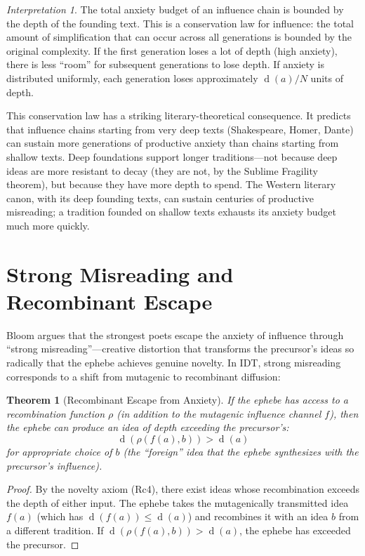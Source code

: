 \documentclass[11pt,openany]{book}
\theoremstyle{definition}
\theoremstyle{plain}
\newtheorem{theorem}[axiom]{Theorem}
\theoremstyle{remark}
\newtheorem{interpretation}[axiom]{Interpretation}
\newcommand{\depth}{\operatorname{d}}       %
\begin{document}
\begin{interpretation}
The total anxiety budget of an influence chain is bounded by the depth of the founding text. This is a conservation law for influence: the total amount of simplification that can occur across all generations is bounded by the original complexity. If the first generation loses a lot of depth (high anxiety), there is less ``room'' for subsequent generations to lose depth. If anxiety is distributed uniformly, each generation loses approximately $\depth(a) / N$ units of depth. 

This conservation law has a striking literary-theoretical consequence. It predicts that influence chains starting from very deep texts (Shakespeare, Homer, Dante) can sustain more generations of productive anxiety than chains starting from shallow texts. Deep foundations support longer traditions---not because deep ideas are more resistant to decay (they are not, by the Sublime Fragility theorem), but because they have more depth to spend. The Western literary canon, with its deep founding texts, can sustain centuries of productive misreading; a tradition founded on shallow texts exhausts its anxiety budget much more quickly.
\end{interpretation}

\section{Strong Misreading and Recombinant Escape}

Bloom argues that the strongest poets escape the anxiety of influence through ``strong misreading''---creative distortion that transforms the precursor's ideas so radically that the ephebe achieves genuine novelty. In IDT, strong misreading corresponds to a shift from mutagenic to recombinant diffusion:

\begin{theorem}[Recombinant Escape from Anxiety]
If the ephebe has access to a recombination function $\rho$ (in addition to the mutagenic influence channel $f$), then the ephebe can produce an idea of depth exceeding the precursor's:
\[
\depth(\rho(f(a), b)) > \depth(a)
\]
for appropriate choice of $b$ (the ``foreign'' idea that the ephebe synthesizes with the precursor's influence).
\end{theorem}

\begin{proof}
By the novelty axiom (Rc4), there exist ideas whose recombination exceeds the depth of either input. The ephebe takes the mutagenically transmitted idea $f(a)$ (which has $\depth(f(a)) \leq \depth(a)$) and recombines it with an idea $b$ from a different tradition. If $\depth(\rho(f(a), b)) > \depth(a)$, the ephebe has exceeded the precursor.
\end{proof}
\end{document}
